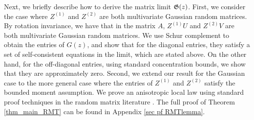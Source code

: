 Next, we briefly describe how to derive the matrix limit ${\mathfrak G}(z)$.
First, we consider the case where $Z^{(1)}$ and $Z^{(2)}$ are both multivariate Gaussian random matrices.
By rotation invariance, we have that in the matrix $A$,  $Z^{(1)} U$ and $Z^{(2)} V$ are both multivariate Gaussian random matrices.
We use Schur complement to obtain the entries of $G(z)$, and show that for the diagonal entries, they satisfy a set of self-consistent equations in the limit, which are stated above.
On the other hand, for the off-diagonal entries, using standard concentration bounds, we show that they are approximately zero.
Second, we extend our result for the Gaussian case to the more general case where the entries of $Z^{(1)}$ and $Z^{(2)}$ satisfy the bounded moment assumption.
We prove an anisotropic local law using standard proof techniques in the random matrix literature \cite{erdos2017dynamical,Anisotropic}.
The full proof of Theorem \ref{thm_main_RMT} can be found in Appendix \ref{sec pf RMTlemma}.
